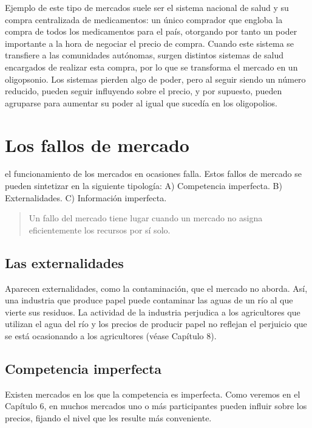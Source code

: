 \documentclass[
]{krantz}
\begin{document}
Ejemplo de este tipo de mercados suele ser el sistema nacional de salud y su compra centralizada de medicamentos: un único comprador que engloba la compra de todos los medicamentos para el país, otorgando por tanto un poder importante a la hora de negociar el precio de compra. Cuando este sistema se transfiere a las comunidades autónomas, surgen distintos sistemas de salud encargados de realizar esta compra, por lo que se transforma el mercado en un oligopsonio. Los sistemas pierden algo de poder, pero al seguir siendo un número reducido, pueden seguir influyendo sobre el precio, y por supuesto, pueden agruparse para aumentar su poder al igual que sucedía en los oligopolios.

\hypertarget{los-fallos-de-mercado}{%
\chapter{Los fallos de mercado}\label{los-fallos-de-mercado}}

el funcionamiento de los mercados en ocasiones falla. Estos fallos de mercado se pueden sintetizar en la siguiente tipología:
A) Competencia imperfecta.
B) Externalidades.
C) Información imperfecta.

\begin{quote}
Un fallo del mercado tiene lugar cuando un mercado no asigna eficientemente los recursos por sí solo.
\end{quote}

\hypertarget{las-externalidades}{%
\section{Las externalidades}\label{las-externalidades}}

Aparecen externalidades, como la contaminación, que el mercado no aborda. Así, una industria que produce papel puede contaminar las aguas de un río al que vierte sus residuos. La actividad de la industria perjudica a los agricultores que utilizan el agua del río y los precios de producir papel no reflejan el perjuicio que se está ocasionando a los agricultores (véase Capítulo 8).

\hypertarget{competencia-imperfecta}{%
\section{Competencia imperfecta}\label{competencia-imperfecta}}

Existen mercados en los que la competencia es imperfecta. Como veremos en el Capítulo 6, en muchos mercados uno o más participantes pueden influir sobre los precios, fijando el nivel que les resulte más conveniente.
\end{document}
